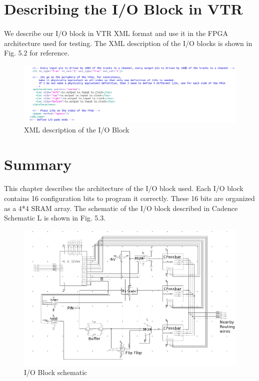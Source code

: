 \section{Describing the I/O Block in VTR}
\paragraph{}
We describe our I/O block in VTR XML format and use it in the FPGA architecture used for testing. The XML description of the I/O blocks is shown in Fig. 5.2 for reference.

\begin{figure}[H]
\centering
\includegraphics[width=\textwidth]{ioblockvtrdescription.png}
\caption{XML description of the I/O Block}
\label{fig:Figure}
\end{figure}


\section{Summary}
\paragraph{}
This chapter describes the architecture of the I/O block used. Each I/O block contains 16 configuration bits to program it correctly. These 16 bits are organized as a 4*4 SRAM array. The schematic of the I/O block described in Cadence Schematic L is shown in Fig. 5.3.

\begin{figure}[H]
\centering
\includegraphics[width=\textwidth]{ioblock.png}
\caption{I/O Block schematic}
\label{fig:Figure}
\end{figure}


